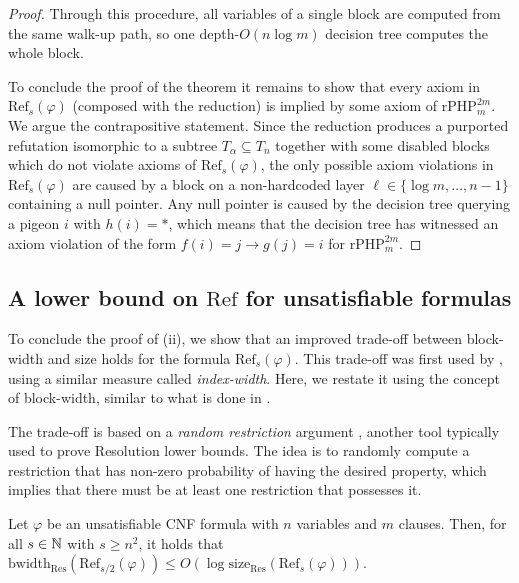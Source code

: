 \begin{proof}
    Through this procedure, all variables of a single block are computed from the same walk-up path, so one depth-$O(n \log m)$ decision tree computes the whole block.

    To conclude the proof of the theorem it remains to show that every axiom in $\mathrm{Ref}_{s}(\varphi)$ (composed with the reduction) is implied by some axiom of $\mathrm{rPHP}^{2m}_m$. We argue the contrapositive statement. Since the reduction produces a purported refutation isomorphic to a subtree $T_\alpha \subseteq T_n$ together with some disabled blocks which do not violate axioms of $\mathrm{Ref}_{s}(\varphi)$, the only possible axiom violations in $\mathrm{Ref}_{s}(\varphi)$ are caused by a block on a non-hardcoded layer $\ell \in \{\log m, \ldots, n-1\}$ containing a null pointer. Any null pointer is caused by the decision tree querying a pigeon $i$ with $h(i) = *$, which means that the decision tree has witnessed an axiom violation of the form $f(i) = j \to g(j) = i$ for $\mathrm{rPHP}_{m}^{2m}$.
\end{proof}

\subsection{A lower bound on $\mathrm{Ref}$ for unsatisfiable formulas}
\label{sec:tradeoffs}

To conclude the proof of (ii), we show that an improved trade-off between block-width and size holds for the formula $\mathrm{Ref}_s(\varphi)$. This trade-off was first used by \textcite{res_nphard}, using a similar measure called \textit{index-width}. Here, we restate it using the concept of block-width, similar to what is done in \cite{alg_nphard}.

The trade-off is based on a \textit{random restriction} argument \cite{pitassi,bs_wigder}, another tool typically used to prove Resolution lower bounds. The idea is to randomly compute a restriction that has non-zero probability of having the desired property, which implies that there must be at least one restriction that possesses it.

\begin{lemma}
    \label{lem:tradeoff_bw_size}
    Let $\varphi$ be an unsatisfiable CNF formula with $n$ variables and $m$ clauses. Then, for all $s \in \mathbb{N}$ with $s \geq n^2$, it holds that $\mathrm{bwidth}_{\mathrm{Res}}(\mathrm{Ref}_{s/2}(\varphi)) \leq O(\log \mathrm{size}_{\mathrm{Res}}(\mathrm{Ref}_{s}(\varphi)))$.
\end{lemma}

